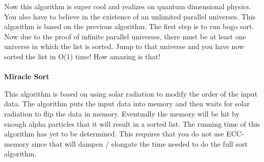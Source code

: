 \documentclass[9pt]{extarticle} %
\begin{document}
\begin{minipage}[t]{.61\linewidth}
Now this algorithm is super cool and realizes on quantum dimensional physics. You also have to
believe in the existence of an unlimited parallel universes. This algorithm is based on the previous
algorithm. The first step is to run bogo sort. Now due to the proof of infinite parallel universes,
there must be at least one universe in which the list is sorted. Jump to that universe and you have
now sorted the list in O(1) time! How amazing is that!
\\
\\
\textbf{Miracle Sort}

This algorithm is based on using solar radiation to modify the order of the input data. The
algorithm puts the input data into memory and then waits for solar radiation to flip the data in
memory. Eventually the memory will be hit by enough alpha particles that it will result in a sorted
list. The running time of this algorithm has yet to be determined. This requires that you do not use
ECC-memory since that will dampen / elongate the time needed to do the full sort algorithm.


\end{minipage} %
\end{document}
